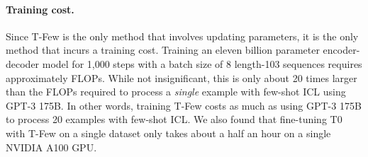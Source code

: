 \documentclass{article}
\newcommand{\tfew}{{\fontfamily{lmtt}\selectfont T-Few}\xspace}
\begin{document}
\paragraph{Training cost.}

Since \tfew is the only method that involves updating parameters, it is the only method that incurs a training cost.
Training an eleven billion parameter encoder-decoder model for 1,000 steps with a batch size of 8 length-103 sequences requires approximately  FLOPs.
While not insignificant, this is only about 20 times larger than the FLOPs required to process a \textit{single} example with few-shot ICL using GPT-3 175B.
In other words, training \tfew costs as much as using GPT-3 175B to process 20 examples with few-shot ICL.
We also found that fine-tuning T0 with \tfew on a single dataset only takes about a half an hour on a single NVIDIA A100 GPU.
\end{document}
